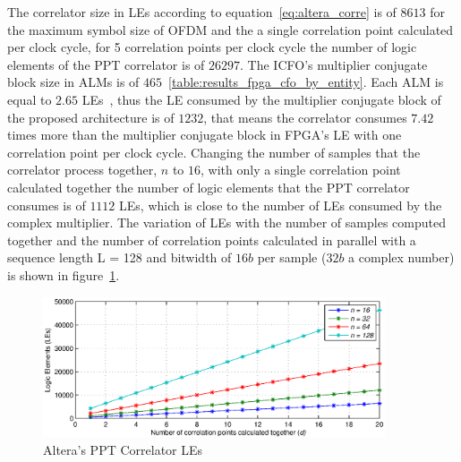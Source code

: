  
The correlator  size  in LEs according to equation~\ref{eq:altera_corre} is of $8613$ for the maximum symbol size of OFDM and the a single correlation point calculated per clock cycle, for 5 correlation points per clock cycle the number of logic elements of the PPT correlator is of  $26297$. The ICFO's multiplier conjugate block size in ALMs is of $465$~\ref{table:results_fpga_cfo_by_entity}. Each ALM is equal to $2.65$ LEs~\cite{cyclonev_device_overview}, thus the LE consumed by the multiplier conjugate block of the proposed architecture is of $1232$, that means the correlator consumes $7.42$ times more than the multiplier conjugate block in FPGA’s LE with one correlation point per clock cycle. Changing the number of samples that the correlator process together, $n$ to $16$, with only a single correlation point calculated together the number of logic elements that the PPT correlator consumes is of $1112$ LEs, which is close to the number of LEs consumed by the complex multiplier. The variation of LEs with the number of samples computed together and the number of correlation points calculated in parallel with a sequence length L = 128  and bitwidth of $16b$ per sample ($32b$ a complex number) is shown in figure~\ref{fig:ppt_correlator_les}.  



 \begin{figure}[!hbt]
  \centering
    \includegraphics[width=0.9\textwidth]
      {./figures/ppt_correlator_perf_32b}
  \caption{Altera's PPT Correlator LEs}
  \label{fig:ppt_correlator_les}
\end{figure}
 
